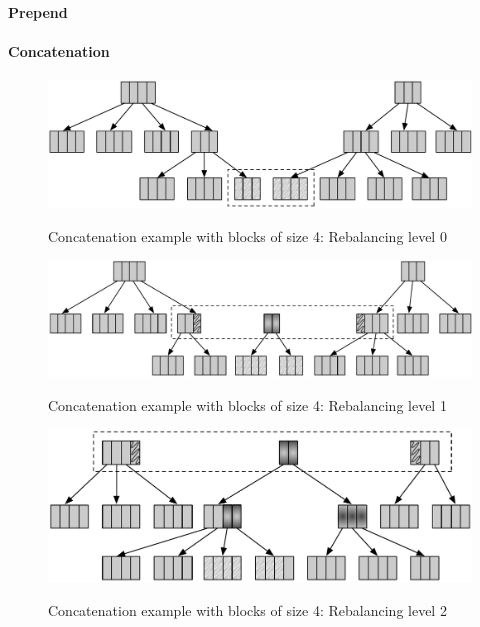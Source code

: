 \paragraph{Prepend}


\paragraph{Concatenation}

\begin{figure}[h!]
  \centering
  \includegraphics[width=\textwidth]{Figures/Concat0.pdf}
  \label{Concat0Benchmarks}
  \caption{Concatenation example with blocks of size 4: Rebalancing level 0}
\end{figure}

\begin{figure}[h!]
  \centering
  \includegraphics[width=\textwidth]{Figures/Concat1.pdf}
  \label{Concat1Benchmarks}
  \caption{Concatenation example with blocks of size 4: Rebalancing level 1}
\end{figure}

\begin{figure}[h!]
  \centering
  \includegraphics[width=\textwidth]{Figures/Concat2.pdf}
  \label{Concat2Benchmarks}
  \caption{Concatenation example with blocks of size 4: Rebalancing level 2}
\end{figure}

